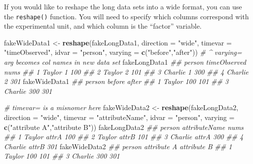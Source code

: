 \documentclass[12pt,krantz2]{krantz}
\makeatletter
\newenvironment{Shaded}{\begin{snugshade}}{\end{snugshade}}
\newcommand{\CommentTok}[1]{\textcolor[rgb]{0.37,0.37,0.37}{\textit{#1}}}
\newcommand{\DataTypeTok}[1]{\textcolor[rgb]{0.27,0.27,0.27}{#1}}
\newcommand{\KeywordTok}[1]{\textcolor[rgb]{0.27,0.27,0.27}{\textbf{#1}}}
\newcommand{\NormalTok}[1]{#1}
\newcommand{\StringTok}[1]{\textcolor[rgb]{0.5,0.5,0.5}{#1}}
\newenvironment{kframe}{%
\medskip{}
\setlength{\fboxsep}{.8em}
 \def\at@end@of@kframe{}%
 \ifinner\ifhmode%
  \def\at@end@of@kframe{\end{minipage}}%
  \begin{minipage}{\columnwidth}%
 \fi\fi%
 \def\FrameCommand##1{\hskip\@totalleftmargin \hskip-\fboxsep
 \colorbox{shadecolor}{##1}\hskip-\fboxsep
     \hskip-\linewidth \hskip-\@totalleftmargin \hskip\columnwidth}%
 \MakeFramed {\advance\hsize-\width
   \@totalleftmargin\z@ \linewidth\hsize
   \@setminipage}}%
 {\par\unskip\endMakeFramed%
 \at@end@of@kframe}
\renewenvironment{Shaded}{\begin{kframe}}{\end{kframe}}
\makeatother
\begin{document}
If you would like to reshape the long data sets into a wide format, you can use the \texttt{reshape()} function. You will need to specify which columns correspond with the experimental unit, and which column is the ``factor'' variable.

\begin{Shaded}
\begin{Highlighting}[]
\NormalTok{fakeWideData1 <-}\StringTok{ }\KeywordTok{reshape}\NormalTok{(fakeLongData1, }
                           \DataTypeTok{direction =} \StringTok{"wide"}\NormalTok{, }
                           \DataTypeTok{timevar =} \StringTok{"timeObserved"}\NormalTok{, }
                           \DataTypeTok{idvar =} \StringTok{"person"}\NormalTok{, }
                           \DataTypeTok{varying =} \KeywordTok{c}\NormalTok{(}\StringTok{"before"}\NormalTok{,}\StringTok{"after"}\NormalTok{)) }
\CommentTok{# ^ varying= arg becomes col names in new data set}
\NormalTok{fakeLongData1}
\CommentTok{##    person timeObserved nums}
\CommentTok{## 1  Taylor            1  100}
\CommentTok{## 2  Taylor            2  101}
\CommentTok{## 3 Charlie            1  300}
\CommentTok{## 4 Charlie            2  301}
\NormalTok{fakeWideData1}
\CommentTok{##    person before after}
\CommentTok{## 1  Taylor    100   101}
\CommentTok{## 3 Charlie    300   301}
\end{Highlighting}
\end{Shaded}

\begin{Shaded}
\begin{Highlighting}[]
\CommentTok{# timevar= is a misnomer here}
\NormalTok{fakeWideData2 <-}\StringTok{ }\KeywordTok{reshape}\NormalTok{(fakeLongData2, }
                           \DataTypeTok{direction =} \StringTok{"wide"}\NormalTok{, }
                           \DataTypeTok{timevar =} \StringTok{"attributeName"}\NormalTok{, }
                           \DataTypeTok{idvar =} \StringTok{"person"}\NormalTok{, }
                           \DataTypeTok{varying =} \KeywordTok{c}\NormalTok{(}\StringTok{"attribute A"}\NormalTok{,}\StringTok{"attribute B"}\NormalTok{)) }
\NormalTok{fakeLongData2}
\CommentTok{##    person attributeName nums}
\CommentTok{## 1  Taylor         attrA  100}
\CommentTok{## 2  Taylor         attrB  101}
\CommentTok{## 3 Charlie         attrA  300}
\CommentTok{## 4 Charlie         attrB  301}
\NormalTok{fakeWideData2}
\CommentTok{##    person attribute A attribute B}
\CommentTok{## 1  Taylor         100         101}
\CommentTok{## 3 Charlie         300         301}
\end{Highlighting}
\end{Shaded}
\end{document}
